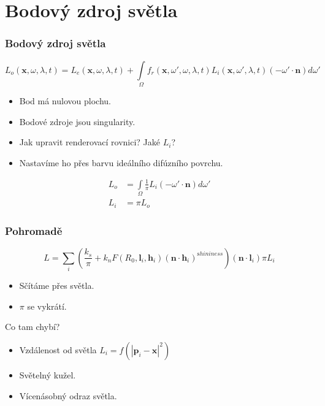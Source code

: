 \section{Bodový zdroj světla}

\begin{frame}
    \frametitle{Bodový zdroj světla}
    \begin{equation*}
        L_o(\mathbf x, \omega, \lambda, t) = L_e(\mathbf x, \omega, \lambda, t) + \int\limits_\Omega f_r(\mathbf x, \omega', \omega, \lambda, t) L_i(\mathbf x, \omega', \lambda, t) (-\omega' \cdot \mathbf n) d \omega'
    \end{equation*}
    \begin{itemize}
        \item Bod má nulovou plochu.
        \item Bodové zdroje jsou singularity.
        \item Jak upravit renderovací rovnici? Jaké $L_i$?
        \pause
        \item Nastavíme ho přes barvu ideálního difúzního povrchu.
    \end{itemize}
    \begin{align*}
        L_o &= \int\limits_\Omega \frac{1}{\pi} L_i (-\omega' \cdot \mathbf n) d \omega' \\
        L_i &= \pi L_o
    \end{align*}
\end{frame}

\begin{frame}
    \frametitle{Pohromadě}
    \begin{equation*}
        L = \sum_i \left(\frac{k_s}{\pi} + k_n F(R_0, \mathbf l_i,\mathbf h_i)(\mathbf n \cdot \mathbf h_i)^{\mathrm shininess}\right)(\mathbf n \cdot \mathbf l_i) \pi L_i
    \end{equation*}
    \begin{itemize}
        \item Sčítáme přes světla.
        \item $\pi$ se vykrátí.
    \end{itemize}
    \pause
    \vfill
    Co tam chybí?
    \pause
    \begin{itemize}
        \item Vzdálenost od světla $L_i = f(|\mathbf p_i - \mathbf x|^2)$
        \item Světelný kužel.
        \item Vícenásobný odraz světla.
    \end{itemize}
\end{frame}

